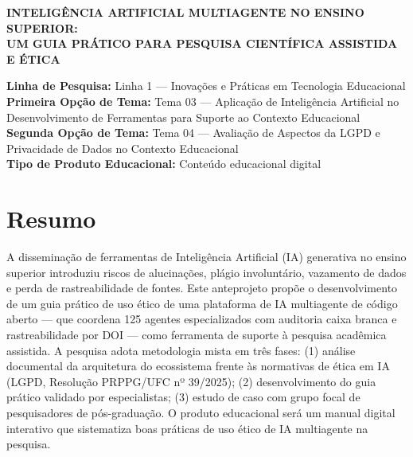 \documentclass[12pt,a4paper]{article}
\author{}
\date{}
\begin{document}
\begin{titlepage}
    \thispagestyle{empty}
    \vspace*{4cm}
    
    \begin{center}
        {\bfseries\large INTELIGÊNCIA ARTIFICIAL MULTIAGENTE NO ENSINO SUPERIOR:\\[0.3cm]
        UM GUIA PRÁTICO PARA PESQUISA CIENTÍFICA ASSISTIDA E ÉTICA}
    \end{center}
    
    \vspace{3cm}
    
    \begin{flushleft}
        \textbf{Linha de Pesquisa:} Linha 1 --- Inovações e Práticas em Tecnologia Educacional\\[0.5cm]
        \textbf{Primeira Opção de Tema:} Tema 03 --- Aplicação de Inteligência Artificial no Desenvolvimento de Ferramentas para Suporte ao Contexto Educacional\\[0.5cm]
        \textbf{Segunda Opção de Tema:} Tema 04 --- Avaliação de Aspectos da LGPD e Privacidade de Dados no Contexto Educacional\\[0.5cm]
        \textbf{Tipo de Produto Educacional:} Conteúdo educacional digital
    \end{flushleft}
    
\end{titlepage}

\section{Resumo}

A disseminação de ferramentas de Inteligência Artificial (IA) generativa no ensino superior introduziu riscos de alucinações, plágio involuntário, vazamento de dados e perda de rastreabilidade de fontes. Este anteprojeto propõe o desenvolvimento de um guia prático de uso ético de uma plataforma de IA multiagente de código aberto --- que coordena 125 agentes especializados com auditoria caixa branca e rastreabilidade por DOI --- como ferramenta de suporte à pesquisa acadêmica assistida. A pesquisa adota metodologia mista em três fases: (1) análise documental da arquitetura do ecossistema frente às normativas de ética em IA (LGPD, Resolução PRPPG/UFC nº 39/2025); (2) desenvolvimento do guia prático validado por especialistas; (3) estudo de caso com grupo focal de pesquisadores de pós-graduação. O produto educacional será um manual digital interativo que sistematiza boas práticas de uso ético de IA multiagente na pesquisa.
\end{document}
